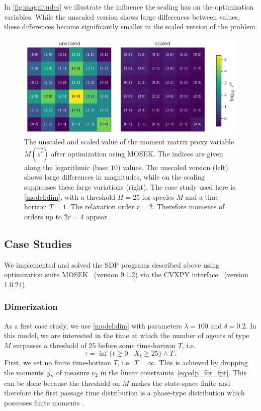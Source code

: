 In \autoref{fig:magnitudes} we illustrate the influence the scaling has on the
optimization variables. While the unscaled version shows large differences
between values, these differences become significantly smaller in the scaled version
of the problem.
\begin{figure}[htb]
    \centering
    \includegraphics[width=\textwidth]{gfx/magnitudes.pdf}
	\caption[Unscaled and scaled value of the moment matrix]{The unscaled and scaled value of the moment matrix proxy variable
    $M(\vec{z'})$ after optimization using MOSEK. The indices are given along the
    logarithmic (base $10$) values. The unscaled version (left) shows large
    differences in magnitudes, while on the scaling suppresses
    these large variations (right). The case study used here is \autoref{model:dim},
    with a threshold $H=25$ for species $M$ and a time-horizon $T=1$. The
    relaxation order $r=2$. Therefore moments of orders up to $2r=4$ appear.}
    \label{fig:magnitudes}
\end{figure}


\subsection{Case Studies}
We implemented and solved the \ac{SDP} programs described above using optimization suite MOSEK~\cite{mosek} (version 9.1.2) via the CVXPY
interface~\cite{cvxpy} (version 1.0.24).

\subsubsection{Dimerization}
As a first case study, we use \autoref{model:dim} with parameters $\lambda=100$ and $\delta=0.2$.
In this model, we are interested in the time at which the number of agents of type $M$
surpasses a threshold of $25$ before some time-horizon $T$,
i.e.\ \[
	\tau=\inf\{t\geq 0\mid X_t \geq 25\}\land T\,.
\]
First, we set no finite time-horizon $T$, i.e.\ $T=\infty$.
This is achieved by dropping the moments $\vec y_2$
of measure $\nu_2$ in the linear constraints~\eqref{eq:sdp_for_fpt}.
This can be done because the threshold on $M$ makes the state-space finite
and therefore the first passage time distribution is a phase-type distribution
which possesses finite moments \cite[Chapter 7.6]{stewart2009probability}.

